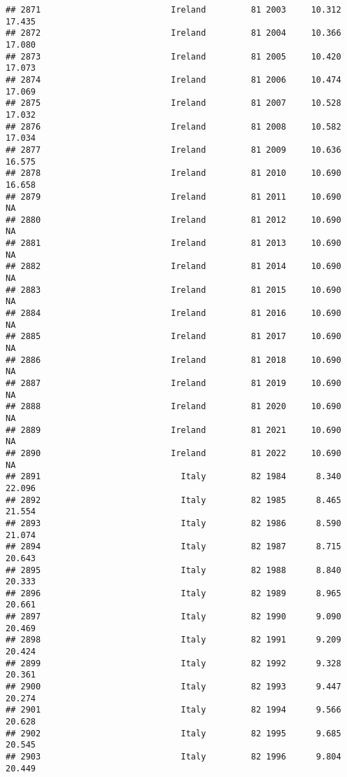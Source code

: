 \documentclass[
]{article}
\begin{document}
\begin{verbatim}
## 2871                          Ireland         81 2003     10.312     17.435
## 2872                          Ireland         81 2004     10.366     17.080
## 2873                          Ireland         81 2005     10.420     17.073
## 2874                          Ireland         81 2006     10.474     17.069
## 2875                          Ireland         81 2007     10.528     17.032
## 2876                          Ireland         81 2008     10.582     17.034
## 2877                          Ireland         81 2009     10.636     16.575
## 2878                          Ireland         81 2010     10.690     16.658
## 2879                          Ireland         81 2011     10.690         NA
## 2880                          Ireland         81 2012     10.690         NA
## 2881                          Ireland         81 2013     10.690         NA
## 2882                          Ireland         81 2014     10.690         NA
## 2883                          Ireland         81 2015     10.690         NA
## 2884                          Ireland         81 2016     10.690         NA
## 2885                          Ireland         81 2017     10.690         NA
## 2886                          Ireland         81 2018     10.690         NA
## 2887                          Ireland         81 2019     10.690         NA
## 2888                          Ireland         81 2020     10.690         NA
## 2889                          Ireland         81 2021     10.690         NA
## 2890                          Ireland         81 2022     10.690         NA
## 2891                            Italy         82 1984      8.340     22.096
## 2892                            Italy         82 1985      8.465     21.554
## 2893                            Italy         82 1986      8.590     21.074
## 2894                            Italy         82 1987      8.715     20.643
## 2895                            Italy         82 1988      8.840     20.333
## 2896                            Italy         82 1989      8.965     20.661
## 2897                            Italy         82 1990      9.090     20.469
## 2898                            Italy         82 1991      9.209     20.424
## 2899                            Italy         82 1992      9.328     20.361
## 2900                            Italy         82 1993      9.447     20.274
## 2901                            Italy         82 1994      9.566     20.628
## 2902                            Italy         82 1995      9.685     20.545
## 2903                            Italy         82 1996      9.804     20.449

\end{verbatim}
\end{document}
